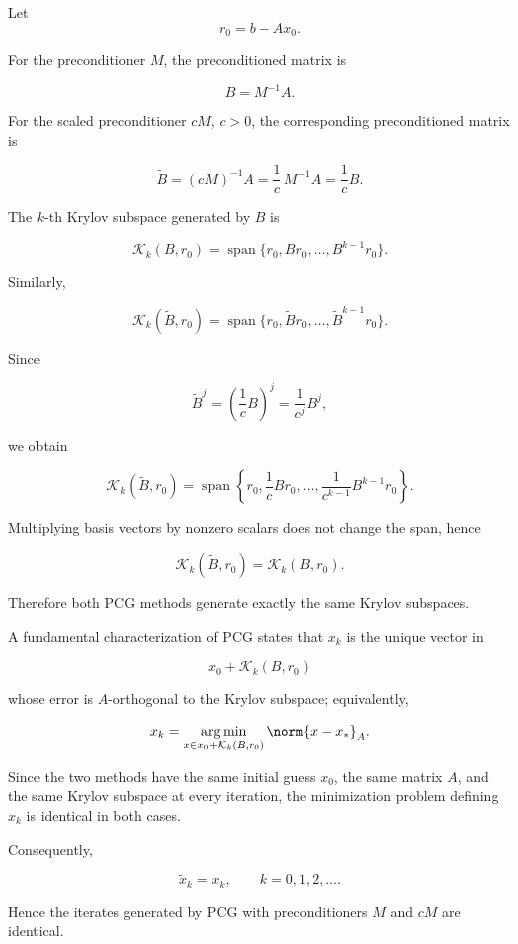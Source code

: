 \documentclass{ctexart}
\begin{document}
\begin{solution}
  Let
  \[
    r_0=b-Ax_0.
  \]

  For the preconditioner \(M\), the preconditioned matrix is

  \[
    B=M^{-1}A.
  \]

  For the scaled preconditioner \(cM\), \(c>0\), the corresponding
  preconditioned matrix is

  \[
    \widetilde B=(cM)^{-1}A
    =\frac1c\,M^{-1}A
    =\frac1c B.
  \]

  The \(k\)-th Krylov subspace generated by \(B\) is

  \[
    \mathcal K_k(B,r_0)
    =
    \operatorname{span}
    \{r_0,Br_0,\ldots,B^{k-1}r_0\}.
  \]

  Similarly,

  \[
    \mathcal K_k(\widetilde B,r_0)
    =
    \operatorname{span}
    \{r_0,\widetilde Br_0,\ldots,\widetilde B^{k-1}r_0\}.
  \]

  Since

  \[
    \widetilde B^j
    =
    \left(\frac1c B\right)^j
    =
    \frac1{c^j}B^j,
  \]

  we obtain

  \[
    \mathcal K_k(\widetilde B,r_0)
    =
    \operatorname{span}
    \left\{
      r_0,
      \frac1cBr_0,
      \ldots,
      \frac1{c^{k-1}}B^{k-1}r_0
    \right\}.
  \]

  Multiplying basis vectors by nonzero scalars does not change the span,
  hence

  \[
    \mathcal K_k(\widetilde B,r_0)
    =
    \mathcal K_k(B,r_0).
  \]

  Therefore both PCG methods generate exactly the same Krylov subspaces.

  A fundamental characterization of PCG states that \(x_k\) is the unique
  vector in

  \[
    x_0+\mathcal K_k(B,r_0)
  \]

  whose error is \(A\)-orthogonal to the Krylov subspace; equivalently,

  \[
    x_k
    =
    \operatorname*{arg\,min}_{x\in x_0+\mathcal K_k(B,r_0)}
    \norm{x-x_*}_A.
  \]

  Since the two methods have the same initial guess \(x_0\), the same
  matrix \(A\), and the same Krylov subspace at every iteration,
  the minimization problem defining \(x_k\) is identical in both cases.

  Consequently,

  \[
    \widetilde x_k=x_k,
    \qquad k=0,1,2,\ldots.
  \]

  Hence the iterates generated by PCG with preconditioners \(M\) and
  \(cM\) are identical.
\end{solution}
\end{document}
